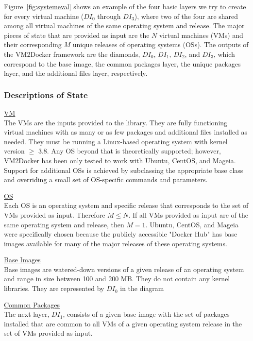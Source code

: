 Figure~\ref{fig:systemeval} shows an example of the four basic layers we try to create for every virtual machine ($DI_0$ through $DI_3$), where two of the four are shared among all virtual machines of the same operating system and release. The major pieces of state that are provided as input are the $N$ virtual machines (VMs) and their corresponding $M$ unique releases of operating systems (OSs). The outputs of the VM2Docker framework are the diamonds, $DI_0$, $DI_1$, $DI_2$, and $DI_3$, which correspond to the base image, the common packages layer, the unique packages layer, and the additional files layer, respectively.

\subsubsection{Descriptions of State}

\underline{VM}\\
The VMs are the inputs provided to the library. They are fully functioning virtual machines with as many or as few packages and additional files installed as needed. They must be running a Linux-based operating system with kernel version $\ge$ 3.8. Any OS beyond that is theoretically supported; however, VM2Docker has been only tested to work with Ubuntu, CentOS, and Mageia. Support for additional OSs is achieved by subclassing the appropriate base class and overriding a small set of OS-specific commands and parameters.

\underline{OS}\\
Each OS is an operating system and specific release that corresponds to the set of VMs provided as input. Therefore $M \le N$. If all VMs provided as input are of the same operating system and release, then $M=1$. Ubuntu, CentOS, and Mageia were specifically chosen because the publicly accessible "Docker Hub" has base images available for many of the major releases of these operating systems.

\underline{Base Images}\\
Base images are watered-down versions of a given release of an operating system and range in size between 100 and 200 MB. They do not contain any kernel libraries. They are represented by $DI_0$ in the diagram

\underline{Common Packages}\\
The next layer, $DI_1$, consists of a given base image with the set of packages installed that are common to all VMs of a given operating system release in the set of VMs provided as input.

